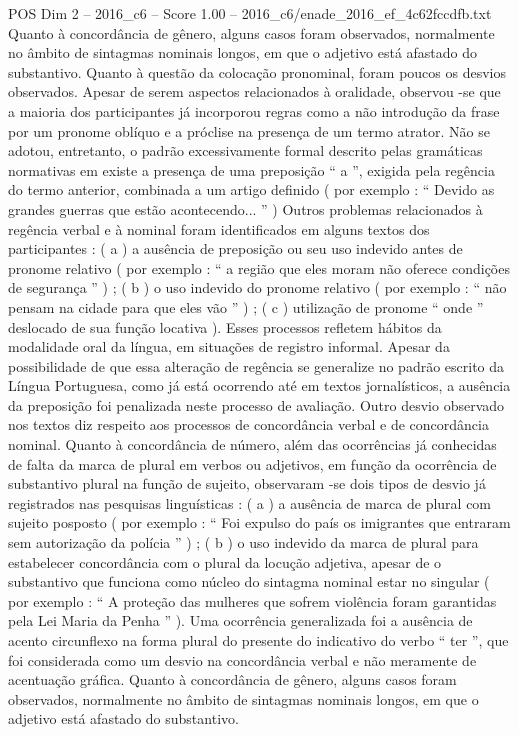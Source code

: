 \begin{textsample}{POS Dim 2 – 2016\_c6 – Score 1.00 – 2016\_c6/enade\_2016\_ef\_4c62fccdfb.txt}
Quanto à concordância de gênero, alguns casos foram observados, normalmente no âmbito de sintagmas nominais longos, em que o adjetivo está afastado do substantivo.
Quanto à questão da colocação pronominal, foram poucos os desvios observados.
Apesar de serem aspectos relacionados à oralidade, observou -se que a maioria dos participantes já incorporou regras como a não introdução da frase por um pronome oblíquo e a próclise na presença de um termo atrator.
Não se adotou, entretanto, o padrão excessivamente formal descrito pelas gramáticas normativas em existe a presença de uma preposição “ a ”, exigida pela regência do termo anterior, combinada a um artigo definido ( por exemplo : “ Devido as grandes guerras que estão acontecendo... ” ) Outros problemas relacionados à regência verbal e à nominal foram identificados em alguns textos dos participantes : ( a ) a ausência de preposição ou seu uso indevido antes de pronome relativo ( por exemplo : “ a região que eles moram não oferece condições de segurança ” ) ; ( b ) o uso indevido do pronome relativo ( por exemplo : “ não pensam na cidade para que eles vão ” ) ; ( c ) utilização de pronome “ onde ” deslocado de sua função locativa ).
Esses processos refletem hábitos da modalidade oral da língua, em situações de registro informal.
Apesar da possibilidade de que essa alteração de regência se generalize no padrão escrito da Língua Portuguesa, como já está ocorrendo até em textos jornalísticos, a ausência da preposição foi penalizada neste processo de avaliação.
Outro desvio observado nos textos diz respeito aos processos de concordância verbal e de concordância nominal.
Quanto à concordância de número, além das ocorrências já conhecidas de falta da marca de plural em verbos ou adjetivos, em função da ocorrência de substantivo plural na função de sujeito, observaram -se dois tipos de desvio já registrados nas pesquisas linguísticas : ( a ) a ausência de marca de plural com sujeito posposto ( por exemplo : “ Foi expulso do país os imigrantes que entraram sem autorização da polícia ” ) ; ( b ) o uso indevido da marca de plural para estabelecer concordância com o plural da locução adjetiva, apesar de o substantivo que funciona como núcleo do sintagma nominal estar no singular ( por exemplo : “ A proteção das mulheres que sofrem violência foram garantidas pela Lei Maria da Penha ” ).
Uma ocorrência generalizada foi a ausência de acento circunflexo na forma plural do presente do indicativo do verbo “ ter ”, que foi considerada como um desvio na concordância verbal e não meramente de acentuação gráfica.
Quanto à concordância de gênero, alguns casos foram observados, normalmente no âmbito de sintagmas nominais longos, em que o adjetivo está afastado do substantivo.

\end{textsample}

